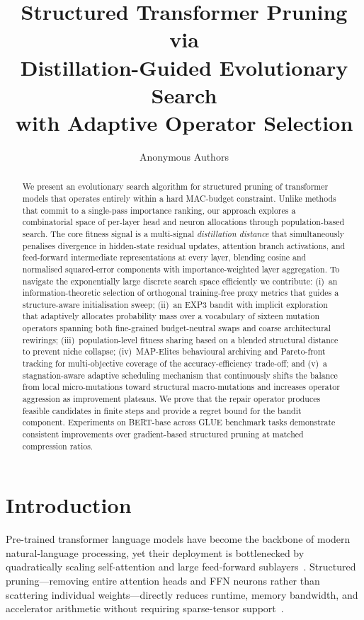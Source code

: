 \documentclass{article}
\title{%
  Structured Transformer Pruning via\\
  Distillation-Guided Evolutionary Search\\
  with Adaptive Operator Selection
}
\author{Anonymous Authors}
\begin{document}
\maketitle

\begin{abstract}
We present an evolutionary search algorithm for structured pruning
of transformer models that operates entirely within a hard MAC-budget
constraint.  Unlike methods that commit to a single-pass importance
ranking, our approach explores a combinatorial space of per-layer head
and neuron allocations through population-based search.
The core fitness signal is a multi-signal \emph{distillation distance}
that simultaneously penalises divergence in hidden-state residual
updates, attention branch activations, and feed-forward intermediate
representations at every layer, blending cosine and normalised
squared-error components with importance-weighted layer aggregation.
To navigate the exponentially large discrete search space efficiently
we contribute: (i)~an information-theoretic selection of orthogonal
training-free proxy metrics that guides a structure-aware
initialisation sweep; (ii)~an EXP3 bandit with implicit exploration
that adaptively allocates probability mass over a vocabulary of
sixteen mutation operators spanning both fine-grained budget-neutral
swaps and coarse architectural rewirings; (iii)~population-level
fitness sharing based on a blended structural distance to prevent
niche collapse; (iv)~MAP-Elites behavioural archiving and Pareto-front
tracking for multi-objective coverage of the accuracy-efficiency
trade-off; and (v)~a stagnation-aware adaptive scheduling mechanism
that continuously shifts the balance from local micro-mutations toward
structural macro-mutations and increases operator aggression as
improvement plateaus.  We prove that the repair operator produces
feasible candidates in finite steps and provide a regret bound for the
bandit component.  Experiments on BERT-base across GLUE benchmark tasks
demonstrate consistent improvements over gradient-based structured
pruning at matched compression ratios.
\end{abstract}

\section{Introduction}
\label{sec:intro}

Pre-trained transformer language models have become the backbone of
modern natural-language processing, yet their deployment is bottlenecked
by quadratically scaling self-attention and large feed-forward
sublayers~\citep{vaswani2017attention}.  Structured pruning—removing
entire attention heads and FFN neurons rather than scattering individual
weights—directly reduces runtime, memory bandwidth, and accelerator
arithmetic without requiring sparse-tensor support~\citep{michel2019sixteen,voita2019analyzing}.
\end{document}
